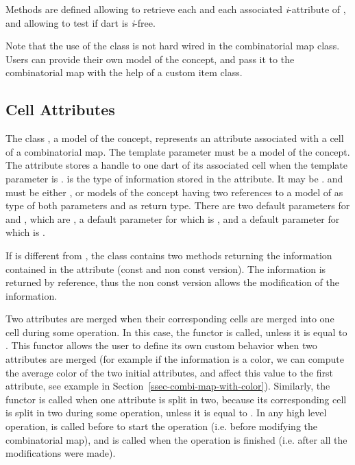 Methods are defined allowing to retrieve each \betai{} and each
associated \emph{i}-attribute of , and allowing to test if 
dart is \emph{i}-free.

Note that the use of the  class is not hard wired in
the combinatorial map class. Users can provide their own model of the
 concept, and pass it to the combinatorial map with the help
of a custom item class.

\subsection{Cell Attributes}\label{ssec-attributes}

The class , a
model of the  concept, represents an attribute
associated with a cell of a combinatorial map.  The 
template parameter  must be a model of the
 concept.  The attribute stores a handle to one
dart of its associated cell when the template parameter  is
.
 is the type of information stored in the attribute. It may
be .   and  must be either
, or models of the  concept
having two references to a model of  as type of
both parameters and  as return type.  There are two default
parameters for  and , which are
, a default parameter for  which is
, and a default parameter for  which is
.

If  is different from , the class
 contains two methods  returning the
information contained in the attribute (const and non const version).
The information is returned by reference, thus the non const version
allows the modification of the information.

Two attributes are merged when their corresponding cells are merged
into one cell during some operation. In this case, the functor
 is called, unless it is equal to .
This functor allows the user to define its own custom behavior when
two attributes are merged (for example if the information is a color,
we can compute the average color of the two initial attributes, and
affect this value to the first attribute, see example in
Section~\ref{ssec-combi-map-with-color}).  Similarly, the functor
 is called when one attribute is split in two, because
its corresponding cell is split in two during some operation, unless
it is equal to .  In any high level operation,
 is called before to start the operation (i.e. before
modifying the combinatorial map), and  is called when the
operation is finished (i.e. after all the modifications were made).

